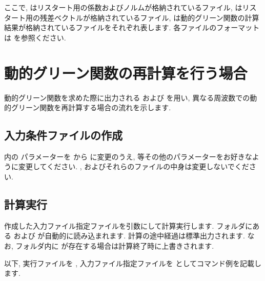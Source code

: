 \documentclass[letterpaper,10pt,dvipdfmx,openany]{sphinxmanual}
\begin{document}
ここで,
 はリスタート用の係数およびノルムが格納されているファイル,
 はリスタート用の残差ベクトルが格納されているファイル,
 は動的グリーン関数の計算結果が格納されているファイルをそれぞれ表します.
各ファイルのフォーマットは
{\hyperref[\detokenize{shiftk_format_ja:revec}]{}} \sphinxhyphen{} {\hyperref[\detokenize{shiftk_format_ja:dynamicalg}]{}} を参照ください.


\section{動的グリーン関数の再計算を行う場合}
\label{\detokenize{shiftk_flow_ja:id8}}
動的グリーン関数を求めた際に出力される  および  を用い,
異なる周波数での動的グリーン関数を再計算する場合の流れを示します.


\subsection{入力条件ファイルの作成}
\label{\detokenize{shiftk_flow_ja:id9}}
 内の  パラメーターを  から 
に変更のうえ,   等その他のパラメーターをお好きなように変更してください.
 ,   およびそれらのファイルの中身は変更しないでください.


\subsection{計算実行}
\label{\detokenize{shiftk_flow_ja:id10}}
作成した入力ファイル指定ファイルを引数にして計算実行します.
 フォルダにある  および  が自動的に読み込まれます.
計算の途中経過は標準出力されます.
なお,   フォルダ内に  が存在する場合は計算終了時に上書きされます.

以下, 実行ファイルを  ,
入力ファイル指定ファイルを  としてコマンド例を記載します.
\end{document}
